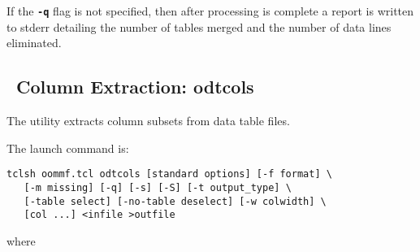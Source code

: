 If the \texttt{\textbf{-q}} flag is not specified, then after
processing is complete a report is written to stderr detailing the
number of tables merged and the number of data lines eliminated.


\subsection{\ODT\ Column Extraction: odtcols}\label{sec:odtcols}%

The  utility extracts column
subsets from  data
table files.

The  launch command is:
\begin{verbatim}
tclsh oommf.tcl odtcols [standard options] [-f format] \
   [-m missing] [-q] [-s] [-S] [-t output_type] \
   [-table select] [-no-table deselect] [-w colwidth] \
   [col ...] <infile >outfile
\end{verbatim}
where
